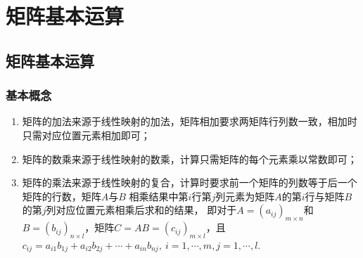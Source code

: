 \chapter{矩阵基本运算}

\section{矩阵基本运算}
\subsection{基本概念}
\begin{enumerate}
	\item 矩阵的加法来源于线性映射的加法，矩阵相加要求两矩阵行列数一致，相加时只需对应位置元素相加即可；
	\item 矩阵的数乘来源于线性映射的数乘，计算只需矩阵的每个元素乘以常数即可；
	\item 矩阵的乘法来源于线性映射的复合，计算时要求前一个矩阵的列数等于后一个矩阵的行数，矩阵$A$与$B$
	相乘结果中第$i$行第$j$列元素为矩阵$A$的第$i$行与矩阵$B$的第$j$列对应位置元素相乘后求和的结果，
	即对于$A=(a_{ij})_{m \times n}$和$B=(b_{ij})_{n \times l}$，矩阵$C=AB=(c_{ij})_{m \times l}$，且
	$c_{ij}=a_{i1}b_{1j}+a_{i2}b_{2j}+\cdots+a_{in}b_{nj},\ i=1,\cdots,m,j=1,\cdots,l$.
\end{enumerate}

